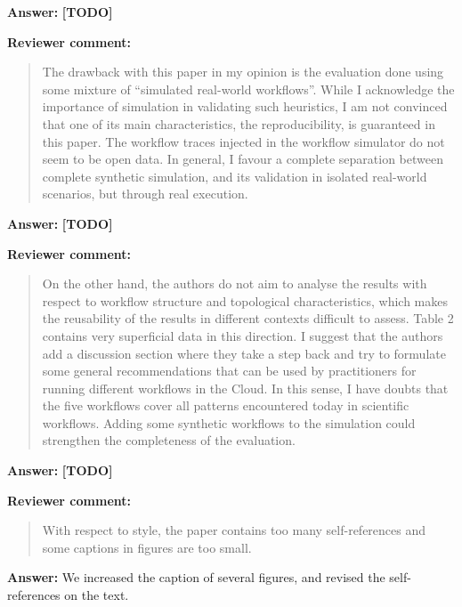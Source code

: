 \documentclass{letter}
\newenvironment{review}%
{\textbf{Reviewer comment:}\begin{quote}}%
{\end{quote}}%
\newcommand{\todo}[1]{%
      \color{red}\textbf{[TODO]} #1\color{black}}
\newcommand{\answer}[1]{%
      \textbf{Answer:} #1}
\begin{document}
\begin{letter}{}
\answer{\todo{}}



\begin{review}
The drawback with this paper in my opinion is the evaluation done using some mixture of ``simulated real-world workflows''. While I acknowledge the importance of simulation in validating such heuristics, I am not convinced that one of its main characteristics, the reproducibility, is guaranteed in this paper. The workflow traces injected in the workflow simulator do not seem to be open data. In general, I favour a complete separation between complete synthetic simulation, and its validation in isolated real-world scenarios, but through real execution. 
\end{review}

\answer{\todo{}}



\begin{review}
On the other hand, the authors do not aim to analyse the results with respect to workflow structure and topological characteristics, which makes the reusability of the results in different contexts difficult to assess. Table 2 contains very superficial data in this direction. I suggest that the authors add a discussion section where they take a step back and try to formulate some general recommendations that can be used by practitioners for running different workflows in the Cloud. In this sense, I have doubts that the five workflows cover all patterns encountered today in scientific workflows. Adding some synthetic workflows to the simulation could strengthen the completeness of the evaluation.
\end{review}

\answer{\todo{}}



\begin{review}
With respect to style, the paper contains too many self-references and some captions in figures are too small.
\end{review}

\answer{We increased the caption of several figures, and revised the self-references on the text.}



\end{letter}
\end{document}
